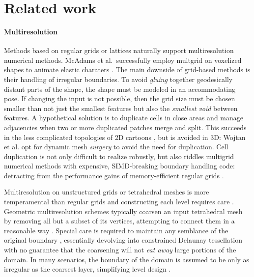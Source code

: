 \section{Related work}
\label{sec:related}


\paragraph{Multiresolution}
%
Methods based on regular grids or lattices naturally support multiresolution numerical methods.
%
McAdams et al.\ successfully employ multgrid on voxelized shapes to animate
elastic charaters .
%
The main downside of grid-based methods is their handling of irregular
boundaries.
%
To avoid \emph{gluing} together geodesically distant parts of the shape, the
shape must be modeled in an accommodating pose. If changing the input is not
possible, then the grid size must be chosen smaller than not just the smallest
features but also the \emph{smallest void} between features.
%
A hypothetical solution is to duplicate cells in close areas and manage
adjacencies when two or more duplicated patches merge and split.
%
This succeeds in the less complicated topologies of 2D cartoons
\cite{Sykora09}, but is avoided in 3D: Wojtan et al.
 opt for dynamic mesh \emph{surgery} to avoid the
need for duplication.
%
Cell duplication is not only difficult to realize robustly, but also riddles
multigrid numerical methods with expensive, SIMD-breaking boundary handling
code: detracting from the performance gains of memory-efficient regular grids
\cite{Demmel04}.

Multiresolution on unstructured grids or tetrahedral meshes is more
temperamental than regular grids and constructing each level requires care
\cite{fish1995efficient}.
%
Geometric multiresolution schemes typically coarsen an input tetrahedral mesh
by removing all but a subset of its vertices, attempting to connect them in a
reasonable way \cite{guillard1993,Adams:1999:PMS}. Special care is required to
maintain any semblance of the original boundary \cite{Brune:2011}, essentially
devolving into constrained Delaunay tessellation with no guarantee that the
coarsening will not \emph{eat away} large portions of the domain.
%
In many scenarios, the boundary of the domain is assumed to be only as
irregular as the coarsest layer, simplifying level design \cite{feng1997non}.

%


